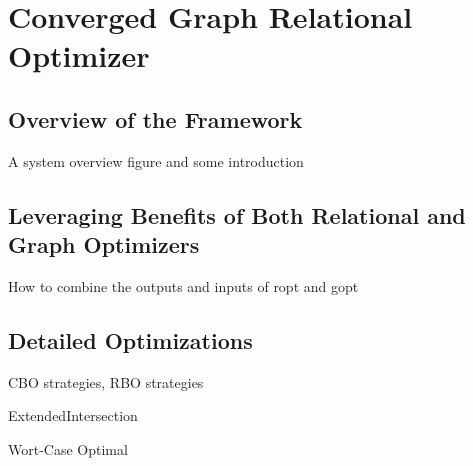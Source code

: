 \section{Converged Graph Relational Optimizer}

\subsection{Overview of the Framework}

A system overview figure and some introduction

\subsection{Leveraging Benefits of Both Relational and Graph Optimizers}

How to combine the outputs and inputs of ropt and gopt

\subsection{Detailed Optimizations}

CBO strategies, RBO strategies

ExtendedIntersection

Wort-Case Optimal